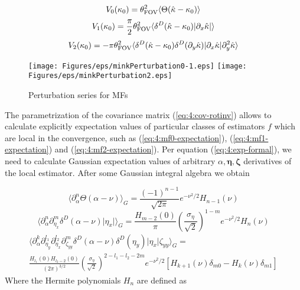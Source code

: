 \begin{equation}
\label{eq:4:mf0-expectation}
V_0(\kappa_0) = \theta_{\rm FOV}^2\langle\Theta(\hat{\kappa}-\kappa_0)\rangle
\end{equation} 
%
\begin{equation}
\label{eq:4:mf1-expectation}
V_1(\kappa_0) = \frac{\pi}{2}\theta_{\rm FOV}^2\langle\delta^D(\hat{\kappa}-\kappa_0)\vert\partial_x\hat{\kappa}\vert\rangle
\end{equation} 
%
\begin{equation}
\label{eq:4:mf2-expectation}
V_2(\kappa_0) = -\pi\theta_{\rm FOV}^2\langle\delta^D(\hat{\kappa}-\kappa_0)\delta^D(\partial_y\hat{\kappa})\vert\partial_x\hat{\kappa}\vert\partial^2_y\hat{\kappa}\rangle
\end{equation}
%
\begin{figure}
\begin{center}
\texttt{[image: Figures/eps/minkPerturbation0-1.eps]}
\texttt{[image: Figures/eps/minkPerturbation2.eps]}
\end{center}
\caption{Perturbation series for MFs}
\label{fig:4:minkpert}
\end{figure}
%
The parametrization of the covariance matrix (\ref{eq:4:cov-rotinv}) allows to calculate explicitly expectation values of particular classes of estimators $f$ which are local in the convergence, such as (\ref{eq:4:mf0-expectation}), (\ref{eq:4:mf1-expectation}) and (\ref{eq:4:mf2-expectation}). Per equation (\ref{eq:4:exp-formal}), we need to calculate Gaussian expectation values of arbitrary $\alpha,\pmb{\eta},\pmb{\zeta}$ derivatives of the local estimator. After some Gaussian integral algebra we obtain

\begin{equation}
\label{eq:4:Rv0}
\langle\partial_\alpha^n\Theta(\alpha-\nu)\rangle_G = \frac{(-1)^{n-1}}{\sqrt{2\pi}}e^{-\nu^2/2}H_{n-1}(\nu) 
\end{equation}
%
\begin{equation}
\label{eq:4:Rv1}
\langle\partial_\alpha^n\partial_{\eta_x}^m\delta^D(\alpha-\nu)\vert\eta_x\vert\rangle_G = \frac{H_{m-2}(0)}{\pi}\left(\frac{\sigma_\eta}{\sqrt{2}}\right)^{1-m}e^{-\nu^2/2}H_n(\nu) 
\end{equation} 
%
\begin{equation}
\label{eq:4:Rv2}
\begin{gathered}
\langle\partial_\alpha^k\partial_{\eta_y}^{l_1}\partial_{\eta_x}^{l_2}\partial_{\zeta_{yy}}^m\delta^D(\alpha-\nu)\delta^D(\eta_y)\vert\eta_x\vert\zeta_{yy}\rangle_G = \\
\frac{H_{l_1}(0)H_{l_2-2}(0)}{(2\pi)^{3/2}}\left(\frac{\sigma_\eta}{\sqrt{2}}\right)^{2-l_1-l_2-2m}e^{-\nu^2/2}[H_{k+1}(\nu)\delta_{m0}-H_k(\nu)\delta_{m1}]
\end{gathered} 
\end{equation} 
%
Where the Hermite polynomials $H_n$ are defined as 

